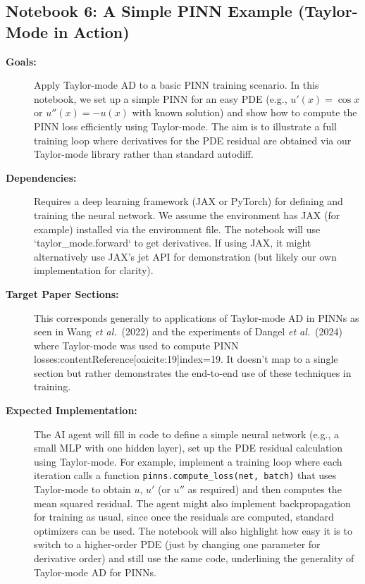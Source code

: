 \documentclass[11pt]{article}
\begin{document}
\subsection{Notebook 6: A Simple PINN Example (Taylor-Mode in Action)}
\begin{description}
  \item[\textbf{Goals:}] Apply Taylor-mode AD to a basic PINN training scenario. In this notebook, we set up a simple PINN for an easy PDE (e.g., $u'(x) = \cos x$ or $u''(x) = -u(x)$ with known solution) and show how to compute the PINN loss efficiently using Taylor-mode. The aim is to illustrate a full training loop where derivatives for the PDE residual are obtained via our Taylor-mode library rather than standard autodiff.
  \item[\textbf{Dependencies:}] Requires a deep learning framework (JAX or PyTorch) for defining and training the neural network. We assume the environment has JAX (for example) installed via the environment file. The notebook will use `taylor_mode.forward` to get derivatives. If using JAX, it might alternatively use JAX's jet API for demonstration (but likely our own implementation for clarity).
  \item[\textbf{Target Paper Sections:}] This corresponds generally to applications of Taylor-mode AD in PINNs as seen in Wang \textit{et al.}\ (2022) and the experiments of Dangel \textit{et al.}\ (2024) where Taylor-mode was used to compute PINN losses:contentReference[oaicite:19]{index=19}. It doesn't map to a single section but rather demonstrates the end-to-end use of these techniques in training.
  \item[\textbf{Expected Implementation:}] The AI agent will fill in code to define a simple neural network (e.g., a small MLP with one hidden layer), set up the PDE residual calculation using Taylor-mode. For example, implement a training loop where each iteration calls a function \texttt{pinns.compute\_loss(net, batch)} that uses Taylor-mode to obtain $u$, $u'$ (or $u''$ as required) and then computes the mean squared residual. The agent might also implement backpropagation for training as usual, since once the residuals are computed, standard optimizers can be used. The notebook will also highlight how easy it is to switch to a higher-order PDE (just by changing one parameter for derivative order) and still use the same code, underlining the generality of Taylor-mode AD for PINNs.
\end{description}
\end{document}
